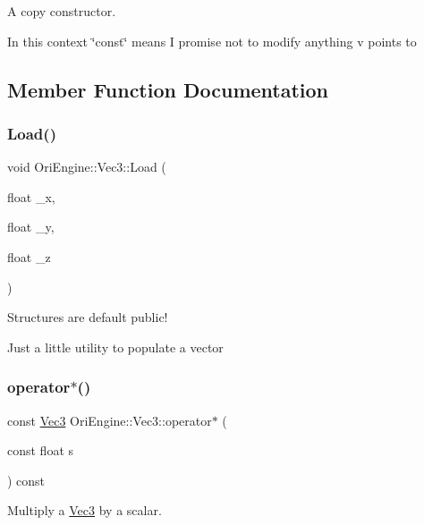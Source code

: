 A copy constructor. 

In this context \char`\"{}const\char`\"{} means I promise not to modify anything v points to 

\subsection{Member Function Documentation}
\hypertarget{struct_ori_engine_1_1_vec3_a5b144d090843acf90840393a1099a228}{}\label{struct_ori_engine_1_1_vec3_a5b144d090843acf90840393a1099a228} 
\subsubsection{\texorpdfstring{Load()}{Load()}}
{\footnotesize\ttfamily void Ori\+Engine\+::\+Vec3\+::\+Load (\begin{DoxyParamCaption}\item[{float}]{\+\_\+x,  }\item[{float}]{\+\_\+y,  }\item[{float}]{\+\_\+z }\end{DoxyParamCaption})\hspace{0.3cm}{\ttfamily [inline]}}



Structures are default public! 

Just a little utility to populate a vector \hypertarget{struct_ori_engine_1_1_vec3_ac32d680353a0bdf43f6ab113834e1986}{}\label{struct_ori_engine_1_1_vec3_ac32d680353a0bdf43f6ab113834e1986} 
\subsubsection{\texorpdfstring{operator$\ast$()}{operator*()}}
{\footnotesize\ttfamily const \hyperlink{struct_ori_engine_1_1_vec3}{Vec3} Ori\+Engine\+::\+Vec3\+::operator$\ast$ (\begin{DoxyParamCaption}\item[{const float}]{s }\end{DoxyParamCaption}) const\hspace{0.3cm}{\ttfamily [inline]}}



Multiply a \hyperlink{struct_ori_engine_1_1_vec3}{Vec3} by a scalar. 

